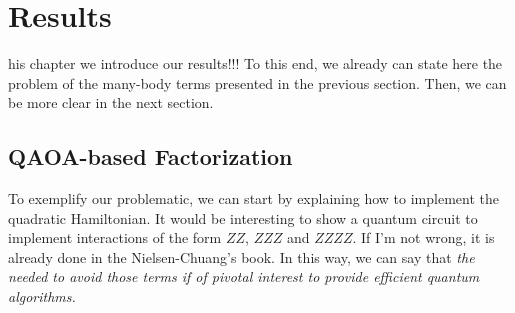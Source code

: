 \chapter{Results}
\label{Chapter:QAOAFactorization}


his chapter we introduce our results!!! To this end, we already can state here the problem of the many-body terms presented in the previous section. Then, we can be more clear in the next section.

\lipsum[1]



\section{QAOA-based Factorization}

To exemplify our problematic, we can start by explaining how to implement the quadratic Hamiltonian. It would be interesting to show a quantum circuit to implement interactions of the form $ZZ$, $ZZZ$ and $ZZZZ$. If I'm not wrong, it is already done in the Nielsen-Chuang's book. In this way, we can say that \textit{the needed to avoid those terms if of pivotal interest to provide efficient quantum algorithms.}

